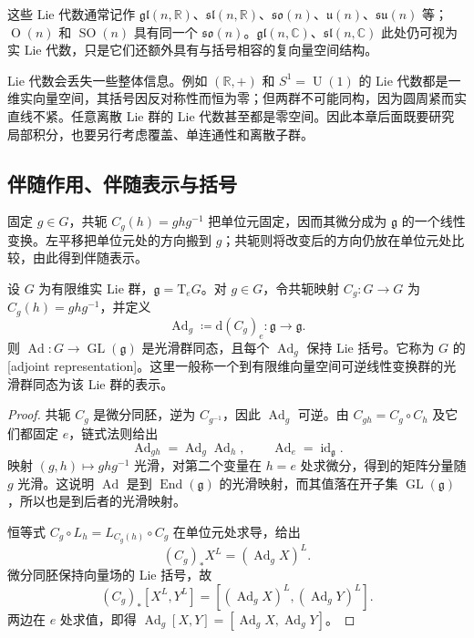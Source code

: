 这些 Lie 代数通常记作 \(\mathfrak{gl}(n,\mathbb R)\)、\(\mathfrak{sl}(n,\mathbb R)\)、\(\mathfrak{so}(n)\)、\(\mathfrak u(n)\)、\(\mathfrak{su}(n)\) 等；\(\operatorname{O}(n)\) 和 \(\operatorname{SO}(n)\) 具有同一个 \(\mathfrak{so}(n)\)。\(\mathfrak{gl}(n,\mathbb C)\)、\(\mathfrak{sl}(n,\mathbb C)\) 此处仍可视为实 Lie 代数，只是它们还额外具有与括号相容的复向量空间结构。

\ProseParagraphBreak

Lie 代数会丢失一些整体信息。例如 \((\mathbb R,+)\) 和 \(S^1=\operatorname{U}(1)\) 的 Lie 代数都是一维实向量空间，其括号因反对称性而恒为零；但两群不可能同构，因为圆周紧而实直线不紧。任意离散 Lie 群的 Lie 代数甚至都是零空间。因此本章后面既要研究局部积分，也要另行考虑覆盖、单连通性和离散子群。

\subsection{伴随作用、伴随表示与括号}
\label{g1:subsec:1601:03}

固定 \(g\in G\)，共轭 \(C_g(h)=ghg^{-1}\) 把单位元固定，因而其微分成为 \(\mathfrak g\) 的一个线性变换。左平移把单位元处的方向搬到 \(g\)；共轭则将改变后的方向仍放在单位元处比较，由此得到伴随表示。

\begin{proposition}\label{g1:prop:adjoint-representation}
	设 \(G\) 为有限维实 Lie 群，\(\mathfrak g=\mathrm{T}_eG\)。对 \(g\in G\)，令共轭映射 \(C_g:G\to G\) 为 \(C_g(h)=ghg^{-1}\)，并定义
	\[
		\operatorname{Ad}_g\coloneqq\mathrm{d}(C_g)_e:\mathfrak g\longrightarrow\mathfrak g.
	\]
	则 \(\operatorname{Ad}:G\to\operatorname{GL}(\mathfrak g)\) 是光滑群同态，且每个 \(\operatorname{Ad}_g\) 保持 Lie 括号。它称为 \(G\) 的[adjoint representation]。这里一般称一个到有限维向量空间可逆线性变换群的光滑群同态为该 Lie 群的表示。
\end{proposition}
\begin{proof}
	共轭 \(C_g\) 是微分同胚，逆为 \(C_{g^{-1}}\)，因此 \(\operatorname{Ad}_g\) 可逆。由 \(C_{gh}=C_g\circ C_h\) 及它们都固定 \(e\)，链式法则给出
	\[
		\operatorname{Ad}_{gh}=\operatorname{Ad}_g\operatorname{Ad}_h,\qquad
		\operatorname{Ad}_e=\operatorname{id}_{\mathfrak g}.
	\]
	映射 \((g,h)\mapsto ghg^{-1}\) 光滑，对第二个变量在 \(h=e\) 处求微分，得到的矩阵分量随 \(g\) 光滑。这说明 \(\operatorname{Ad}\) 是到 \(\operatorname{End}(\mathfrak g)\) 的光滑映射，而其值落在开子集 \(\operatorname{GL}(\mathfrak g)\)，所以也是到后者的光滑映射。

	恒等式 \(C_g\circ L_h=L_{C_g(h)}\circ C_g\) 在单位元处求导，给出
	\[
		(C_g)_*X^L=(\operatorname{Ad}_gX)^L.
	\]
	微分同胚保持向量场的 Lie 括号，故
	\[
		(C_g)_*[X^L,Y^L]
		=[(\operatorname{Ad}_gX)^L,(\operatorname{Ad}_gY)^L].
	\]
	两边在 \(e\) 处求值，即得 \(\operatorname{Ad}_g[X,Y]=[\operatorname{Ad}_gX,\operatorname{Ad}_gY]\)。
\end{proof}

